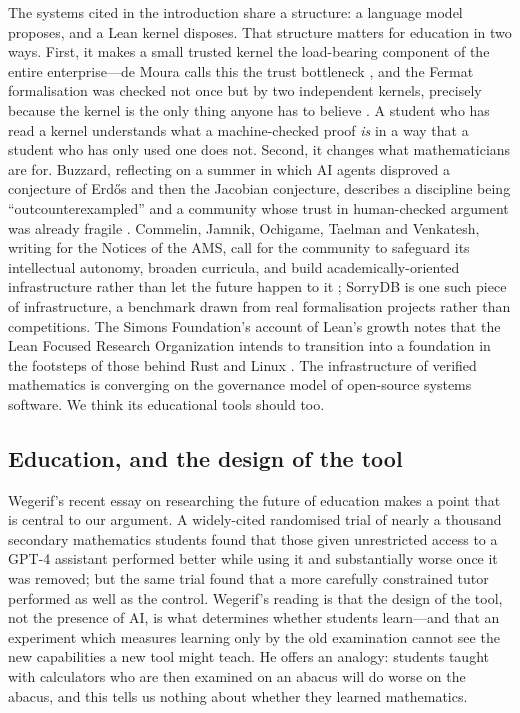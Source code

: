 \documentclass[11pt]{article}
\begin{document}
The systems cited in the introduction share a structure: a language model
proposes, and a Lean kernel disposes. That structure matters for education in
two ways. First, it makes a small trusted kernel the load-bearing component of
the entire enterprise---de Moura calls this the trust bottleneck
\cite{peterman2024}, and the Fermat formalisation was checked not once but by
two independent kernels, precisely because the kernel is the only thing anyone
has to believe \cite{anthropic2026flt}. A student who has read a kernel understands
what a machine-checked proof \emph{is} in a way that a student who has only
used one does not. Second, it changes what mathematicians are for. Buzzard,
reflecting on a summer in which AI agents disproved a conjecture of Erd\H{o}s
and then the Jacobian conjecture, describes a discipline being
``outcounterexampled'' and a community whose trust in human-checked argument was
already fragile \cite{buzzard2026counter}. Commelin, Jamnik, Ochigame, Taelman
and Venkatesh, writing for the Notices of the AMS, call for the community to
safeguard its intellectual autonomy, broaden curricula, and build
academically-oriented infrastructure rather than let the future happen to it
\cite{commelin2026}; SorryDB \cite{letson2026} is one such piece of
infrastructure, a benchmark drawn from real formalisation projects rather than
competitions. The Simons Foundation's account of Lean's growth notes that the
Lean Focused Research Organization intends to transition into a foundation in
the footsteps of those behind Rust and Linux \cite{simons2026}. The
infrastructure of verified mathematics is converging on the governance model of
open-source systems software. We think its educational tools should too.

\subsection{Education, and the design of the tool}

Wegerif's recent essay on researching the future of education
\cite{wegerif2026} makes a point that is central to our argument. A widely-cited
randomised trial of nearly a thousand secondary mathematics students
\cite{bastani2025} found that those given unrestricted access to a GPT-4
assistant performed better while using it and substantially worse once it was
removed; but the same trial found that a more carefully constrained tutor
performed as well as the control. Wegerif's reading is that the design of the
tool, not the presence of AI, is what determines whether students learn---and
that an experiment which measures learning only by the old examination cannot
see the new capabilities a new tool might teach. He offers an analogy: students
taught with calculators who are then examined on an abacus will do worse on
the abacus, and this tells us nothing about whether they learned mathematics.
\end{document}
